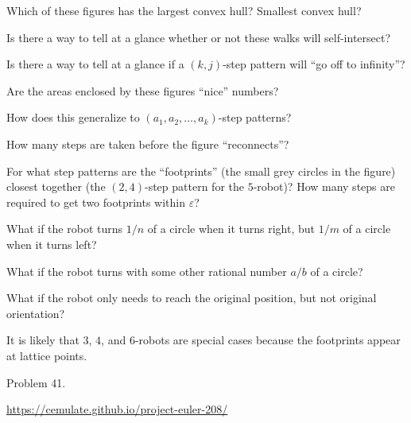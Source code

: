 \documentclass{article}
\begin{document}
\begin{related}
  \item Which of these figures has the largest convex hull? Smallest convex hull?
  \item Is there a way to tell at a glance whether or not these walks will
    self-intersect?
  \item Is there a way to tell at a glance if a $(k,j)$-step pattern will
    ``go off to infinity''?
  \item Are the areas enclosed by these figures ``nice'' numbers?
  \item How does this generalize to $(a_1, a_2, \hdots, a_k)$-step patterns?
  \item How many steps are taken before the figure ``reconnects''?
  \item For what step patterns are the ``footprints'' (the small grey circles
    in the figure) closest together (the $(2, 4)$-step pattern for the
    $5$-robot)?
    How many steps are required to get two footprints within $\varepsilon$?
  \item What if the robot turns $1/n$ of a circle when it turns right, but
    $1/m$ of a circle when it turns left?
  \item What if the robot turns with some other rational number $a/b$ of a
    circle?
  \item What if the robot only needs to reach the original position, but
    not original orientation?
\end{related}
\begin{note}
  It is likely that $3$, $4$, and $6$-robots are special cases because the
  footprints appear at lattice points.
\end{note}
\begin{references}
  \item Problem 41.
  \item \url{https://cemulate.github.io/project-euler-208/}
\end{references}
\end{document}
